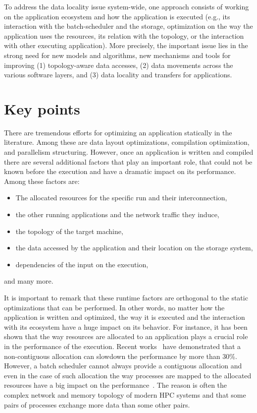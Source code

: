 To address the data locality issue system-wide, one approach consists of
working on the application ecosystem and how the application is executed
(e.g., its interaction with the batch-scheduler and the storage,
optimization on the way the application uses the resources, its relation
with the topology, or the interaction with other executing application). 
%
More precisely, the important issue lies in the strong need for new
models and algorithms, new mechanisms and tools for improving (1)
topology-aware data accesses, (2) data movements across the various
software layers, and (3) data locality and transfers for applications. 


\section{Key points}
There are tremendous efforts for optimizing an application statically in
the literature. Among these are data layout optimizations, compilation
optimization, and parallelism structuring. However, once an application
is written and compiled there are several additional factors that play an important
role, that could not be known before the execution and have a dramatic
impact on its performance. Among these factors are:
\begin{itemize}
\item The allocated resources for the specific run and their interconnection,
\item the other running applications and the network traffic they induce,   
\item the topology of the target machine,
\item the data accessed by the application and their location on the storage
  system,
\item dependencies of the input on the execution,
\end{itemize}
and many more.

It is important to remark that these runtime factors are orthogonal to
the static optimizations that can be performed. In other words, no
matter how the application is written and optimized, the way it is
executed and the interaction with its ecosystem have a huge impact on its
behavior. For instance, it has been shown that  the way resources are
allocated to an application plays a crucial role in the performance of the
execution.  Recent works~\cite{cui2013accelerating,kramer13} have
demonstrated that a non-contiguous allocation can slowdown the
performance by more than 30\%. However, a batch scheduler cannot always
provide a contiguous allocation and even in the case of such allocation
the way processes are mapped to the allocated resources have a big
impact on the performance~\cite{DBLP:conf/ics/ChenCHRK06,jm10}. The
reason is often the complex network and memory topology of modern HPC
systems and that some pairs of processes exchange more data than some
other pairs. 

